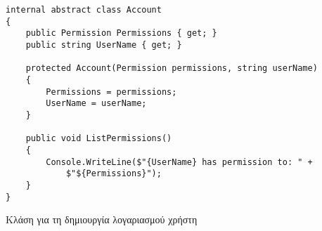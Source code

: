 \begin{listing}[htbp]
\begin{verbatim}
internal abstract class Account
{
    public Permission Permissions { get; }
    public string UserName { get; }

    protected Account(Permission permissions, string userName)
    {
        Permissions = permissions;
        UserName = userName;
    }

    public void ListPermissions()
    {
        Console.WriteLine($"{UserName} has permission to: " +
            $"${Permissions}");
    }
}
\end{verbatim}
\caption{Κλάση για τη δημιουργία λογαριασμού χρήστη}
\label{flagsMainClass}
\end{listing}